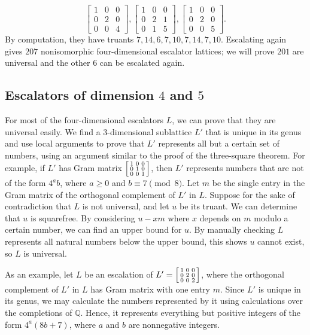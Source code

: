 \documentclass{article}
\begin{document}
\[\begin{bmatrix} 1 & 0 & 0 \\ 0 & 2 & 0 \\ 0 & 0 & 4 \end{bmatrix}, \begin{bmatrix} 1 & 0 & 0 \\ 0 & 2 & 1 \\ 0 & 1 & 5 \end{bmatrix}, \begin{bmatrix} 1 & 0 & 0 \\ 0 & 2 & 0 \\ 0 & 0 & 5 \end{bmatrix}.\]
By computation, they have truants $7, 14, 6, 7, 10, 7, 14, 7, 10$. Escalating again gives $207$ nonisomorphic four-dimensional escalator lattices; we will prove $201$ are universal and the other $6$ can be escalated again.

\subsection{Escalators of dimension $4$ and $5$}
For most of the four-dimensional escalators $L$, we can prove that they are universal easily. We find a $3$-dimensional sublattice $L'$ that is unique in its genus and use local arguments to prove that $L'$ represents all but a certain set of numbers, using an argument similar to the proof of the three-square theorem. For example, if $L'$ has Gram matrix $\begin{bsmallmatrix} 1 & 0 & 0 \\ 0 & 1 & 0 \\ 0 & 0 & 1 \end{bsmallmatrix}$, then $L'$ represents numbers that are not of the form $4^a b$, where $a \ge 0$ and $b \equiv 7 \pmod 8$. Let $m$ be the single entry in the Gram matrix of the orthogonal complement of $L'$ in $L$. Suppose for the sake of contradiction that $L$ is not universal, and let $u$ be its truant. We can determine that $u$ is squarefree. By considering $u - xm$ where $x$ depends on $m$ modulo a certain number, we can find an upper bound for $u$. By manually checking $L$ represents all natural numbers below the upper bound, this shows $u$ cannot exist, so $L$ is universal.

As an example, let $L$ be an escalation of $L' = \begin{bsmallmatrix} 1 & 0 & 0 \\ 0 & 2 & 0 \\ 0 & 0 & 2 \end{bsmallmatrix}$, where the orthogonal complement of $L'$ in $L$ has Gram matrix with one entry $m$. Since $L'$ is unique in its genus, we may calculate the numbers represented by it using calculations over the completions of $\mathbb{Q}$. Hence, it represents everything but positive integers of the form $4^a (8b + 7)$, where $a$ and $b$ are nonnegative integers.
\end{document}
